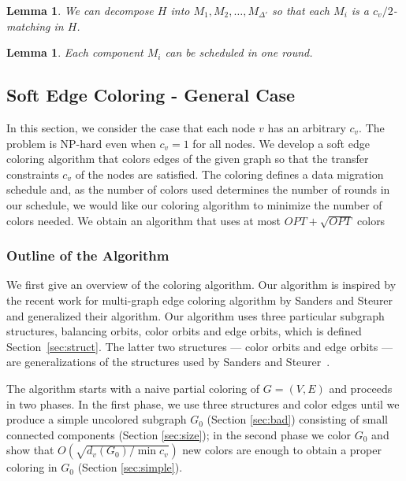 \documentclass[titlepage, 11pt]{article}
\newtheorem{lemma}[theorem]{Lemma}
\begin{document}
\begin{lemma}
We can decompose $H$ into $M_1, M_2, \dots, M_{\Delta'}$
so that each $M_i$ is a $c_v/2$-matching in $H$.
\end{lemma}

\begin{lemma}
Each component $M_i$ can be scheduled in one round.
\end{lemma}

\subsection{Soft Edge Coloring - General Case}
In this section, we consider the case that each node $v$ has an arbitrary $c_v$.
The problem is \textsf{NP}-hard even when $c_v = 1$ for all nodes.
We develop a soft edge coloring algorithm that colors edges of the given graph so that  
the transfer constraints $c_v$ of the nodes are satisfied. 
The coloring defines a data migration schedule and, 
as the number of colors used determines the number of rounds in our schedule, 
we would like our coloring algorithm to minimize the number of colors needed.
We obtain an algorithm that uses at most $OPT + \sqrt{OPT}$ colors

\subsubsection{Outline of the Algorithm}
We first  give an overview of the coloring algorithm. 
Our algorithm is inspired by the recent work for multi-graph edge coloring algorithm by
Sanders and Steurer~\cite{sanders05} and generalized their algorithm.
Our algorithm uses three particular subgraph structures, balancing orbits, color orbits and edge orbits,
which is defined Section~\ref{sec:struct}. 
The latter two structures --- color orbits and edge orbits --- are generalizations of 
the structures used by Sanders and Steurer~\cite{sanders05}.
\iffalse
In Section~\ref{sec:alg} we describe the algorithm in detail and, in Section~\ref{sec:analysis}, show that it uses at most $OPT + O(\sqrt{\frac{d_v(G_0)}{\min c_v}})$ colors.
\fi

The algorithm starts with a naive partial coloring of $G = (V, E)$ and proceeds in two phases. 
In the first phase, we use three structures and color edges until we produce 
a simple uncolored subgraph $G_0$  (Section \ref{sec:bad})
consisting of small connected components (Section \ref{sec:size}); in the second phase 
we color $G_0$ and show that $O(\sqrt{{d_v(G_0)}/{\min c_v}})$ new colors
are enough to obtain a proper coloring in $G_0$ (Section \ref{sec:simple}).
\end{document}
